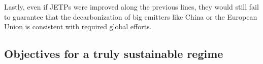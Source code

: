 \documentclass[12pt,english]{article}
\begin{document}
Lastly, even if JETPs were improved along the previous lines, they would still fail to guarantee that the decarbonization of big emitters like China or the European Union is consistent with required global efforts. 


\subsection{Objectives for a truly sustainable regime}

\end{document}
